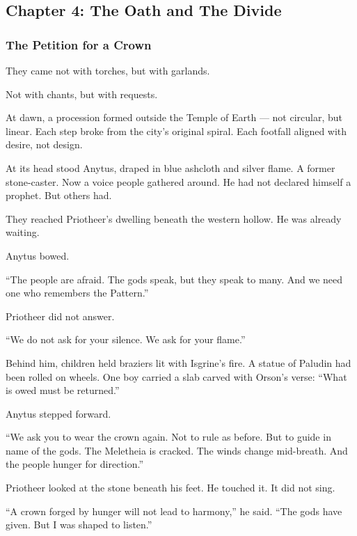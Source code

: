 \documentclass[12pt]{article}
\begin{document}
\newpage

\subsection{Chapter 4: The Oath and The Divide}

\vspace{.5in}

\subsubsection{The Petition for a Crown}

They came not with torches, but with garlands.

Not with chants, but with requests.

At dawn, a procession formed outside the Temple of Earth —  
not circular, but linear.  
Each step broke from the city's original spiral.  
Each footfall aligned with desire, not design.

At its head stood Anytus, draped in blue ashcloth and silver flame.  
A former stone-caster. Now a voice people gathered around.  
He had not declared himself a prophet.  
But others had.

They reached Priotheer's dwelling beneath the western hollow.  
He was already waiting.

Anytus bowed.

 “The people are afraid.  
 The gods speak, but they speak to many.  
 And we need one who remembers the Pattern.”

Priotheer did not answer.

 “We do not ask for your silence.  
 We ask for your flame.”

Behind him, children held braziers lit with Isgrine’s fire.  
A statue of Paludin had been rolled on wheels.  
One boy carried a slab carved with Orson’s verse:  
 “What is owed must be returned.”

Anytus stepped forward.

 “We ask you to wear the crown again.  
 Not to rule as before.  
 But to guide in name of the gods.  
 The Meletheia is cracked.  
 The winds change mid-breath.  
 And the people hunger for direction.”

Priotheer looked at the stone beneath his feet.  
He touched it.  
It did not sing.

 “A crown forged by hunger will not lead to harmony,” he said.  
 “The gods have given.  
 But I was shaped to listen.”
\end{document}
